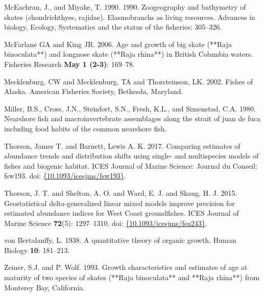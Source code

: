 \documentclass[12pt,]{article}
\begin{document}
\leavevmode\hypertarget{ref-McEachran1990}{}%
McEachran, J., and Miyake, T. 1990. 1990. Zoogeography and bathymetry of
skates (chondrichthyes, rajidae). Elasmobranchs as living resources.
Advances in biology, Ecology, Systematics and the status of the
fisheries: 305--326.

\leavevmode\hypertarget{ref-McFandKing2006}{}%
McFarlane GA and King JR. 2006. Age and growth of big skate (**Raja
binoculata**) and longnose skate (**Raja rhina**) in British Columbia
waters. Fisheries Research \textbf{May 1 (2-3)}: 169--78.

\leavevmode\hypertarget{ref-Mecklenburg2002}{}%
Mecklenburg, CW and Mecklenburg, TA and Thorsteinson, LK. 2002. Fishes
of Alaska. American Fisheries Society, Bethesda, Maryland.

\leavevmode\hypertarget{ref-Miller1980}{}%
Miller, B.S., Cross, J.N., Steinfort, S.N., Fresh, K.L., and Simenstad,
C.A. 1980. Nearshore fish and macroinvertebrate assemblages along the
strait of juan de fuca including food habits of the common nearshore
fish.

\leavevmode\hypertarget{ref-Thorson2017a}{}%
Thorson, James T. and Barnett, Lewis A. K. 2017. Comparing estimates of
abundance trends and distribution shifts using single- and multispecies
models of fishes and biogenic habitat. ICES Journal of Marine Science:
Journal du Conseil: fsw193. doi:
\href{https://doi.org/\%7B10.1093/icesjms/fsw193\%7D}{\{10.1093/icesjms/fsw193\}}.

\leavevmode\hypertarget{ref-Thorson2015}{}%
Thorson, J. T. and Shelton, A. O. and Ward, E. J. and Skaug, H. J. 2015.
Geostatistical delta-generalized linear mixed models improve precision
for estimated abundance indices for West Coast groundfishes. ICES
Journal of Marine Science \textbf{72}(5): 1297--1310. doi:
\href{https://doi.org/\%7B10.1093/icesjms/fsu243\%7D}{\{10.1093/icesjms/fsu243\}}.

\leavevmode\hypertarget{ref-vonBertalanffy1938}{}%
von Bertalanffy, L. 1938. A quantitative theory of organic growth. Human
Biology \textbf{10}: 181--213.

\leavevmode\hypertarget{ref-ZeinerWolf1993}{}%
Zeiner, S.J. and P. Wolf. 1993. Growth characteristics and estimates of
age at maturity of two species of skates (**Raja binoculata** and **Raja
rhina**) from Monterey Bay, California.
\end{document}
